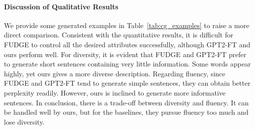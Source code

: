 \documentclass[11pt]{article}
\begin{document}
\paragraph{Discussion of Qualitative Results}
We provide some generated examples in Table~\ref{tab:cg_examples} to raise a more direct comparison. Consistent with the quantitative results, it is difficult for FUDGE to control all the desired attributes successfully, although GPT2-FT and ours perform well. For diversity, it is evident that FUDGE and GPT2-FT prefer to generate short sentences containing very little information. Some words appear highly, yet ours gives a more diverse description. Regarding fluency, since FUDGE and GPT2-FT tend to generate simple sentences, they can obtain better perplexity readily. However, ours is inclined to generate more informative sentences. In conclusion, there is a trade-off between diversity and fluency. It can be handled well by ours, but for the baselines, they pursue fluency too much and lose diversity.
\end{document}
